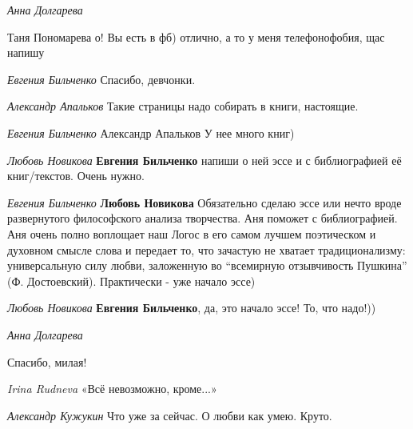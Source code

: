 \emph{Анна Долгарева}

Таня Пономарева о! Вы есть в фб) отлично, а то у меня телефонофобия, щас напишу

\emph{Евгения Бильченко}
Спасибо, девчонки.

\emph{Александр Апальков}
Такие страницы надо собирать в книги, настоящие.

\emph{Евгения Бильченко}
Александр Апальков У нее много книг)

\emph{Любовь Новикова}
\textbf{Евгения Бильченко} напиши о ней эссе и с библиографией её книг/текстов. Очень нужно.

\emph{Евгения Бильченко}
\textbf{Любовь Новикова} Обязательно сделаю эссе или нечто вроде развернутого
философского анализа творчества. Аня поможет с библиографией. Аня очень полно
воплощает наш Логос в его самом лучшем поэтическом и духовном смысле слова и
передает то, что зачастую не хватает традиционализму: универсальную силу любви,
заложенную во \enquote{всемирную отзывчивость Пушкина} (Ф. Достоевский). Практически -
уже начало эссе)

\emph{Любовь Новикова}
\textbf{Евгения Бильченко}, да, это начало эссе! То, что надо!))

\emph{Анна Долгарева}

Спасибо, милая!

\emph{Irina Rudneva}
«Всё невозможно, кроме...»

\emph{Александр Кужукин}
Что уже за сейчас. О любви как умею. Круто.
